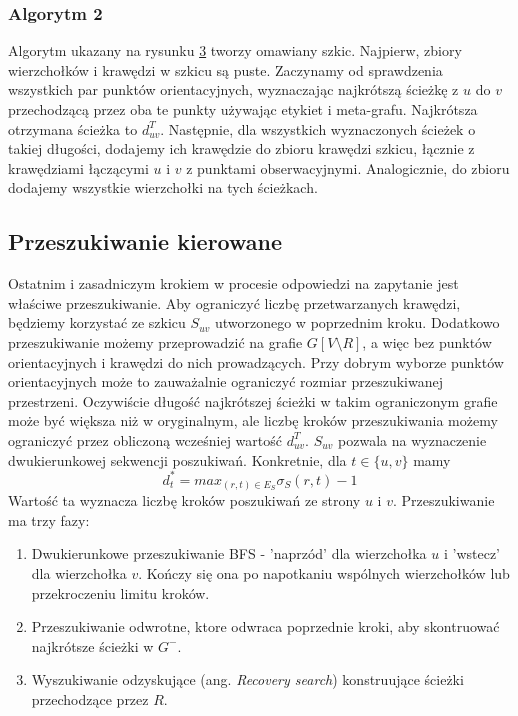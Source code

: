 \documentclass{article}
\theoremstyle{definition}
\begin{document}
        \subsubsection*{Algorytm 2} 
            Algorytm ukazany na rysunku \hyperref[fig:alg3]{3} tworzy omawiany szkic. Najpierw, zbiory wierzchołków i krawędzi w szkicu są puste. Zaczynamy od sprawdzenia wszystkich par punktów orientacyjnych, wyznaczając najkrótszą ścieżkę z $u$ do $v$ przechodzącą przez oba te punkty używając etykiet i meta-grafu. Najkrótsza otrzymana ścieżka to $d_{uv}^T$. Następnie, dla wszystkich wyznaczonych ścieżek o takiej długości, dodajemy ich krawędzie do zbioru krawędzi szkicu, łącznie z krawędziami łączącymi $u$ i $v$ z punktami obserwacyjnymi. Analogicznie, do zbioru dodajemy wszystkie wierzchołki na tych ścieżkach.
    
    \subsection{Przeszukiwanie kierowane}
        Ostatnim i zasadniczym krokiem w procesie odpowiedzi na zapytanie jest właściwe przeszukiwanie. Aby ograniczyć liczbę przetwarzanych krawędzi, będziemy korzystać ze szkicu $S_{uv}$ utworzonego w poprzednim kroku. Dodatkowo przeszukiwanie możemy przeprowadzić na grafie $G[V \setminus R]$, a więc bez punktów orientacyjnych i krawędzi do nich prowadzących. Przy dobrym wyborze punktów orientacyjnych może to zauważalnie  ograniczyć rozmiar przeszukiwanej przestrzeni. Oczywiście długość najkrótszej ścieżki w takim ograniczonym grafie może być większa niż w oryginalnym, ale liczbę kroków przeszukiwania możemy ograniczyć przez obliczoną wcześniej wartość $d_{uv}^T$. $S_{uv}$ pozwala na wyznaczenie dwukierunkowej sekwencji poszukiwań. Konkretnie, dla $t \in \{u,v\}$ mamy 
        \[
            d_{t}^{*} = max_{(r,t) \in E_S} \sigma_S(r, t) - 1
        \]
        Wartość ta wyznacza liczbę kroków poszukiwań ze strony $u$ i $v$. Przeszukiwanie ma trzy fazy:
        \begin{enumerate}
            \item Dwukierunkowe przeszukiwanie BFS - 'naprzód' dla wierzchołka $u$ i 'wstecz' dla wierzchołka $v$. Kończy się ona po napotkaniu wspólnych wierzchołków lub przekroczeniu limitu kroków. 
            \item Przeszukiwanie odwrotne, ktore odwraca poprzednie kroki, aby skontruować najkrótsze ścieżki w $G^{-}$. 
            \item Wyszukiwanie odzyskujące (ang. \textit{Recovery search}) konstruujące ścieżki przechodzące przez $R$. 
        \end{enumerate}
\end{document}
